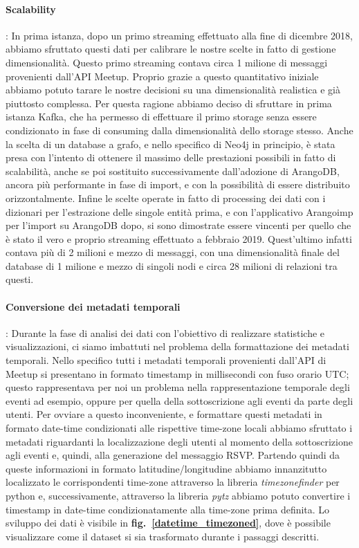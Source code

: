 \documentclass[fleqn,10pt]{SelfArx} %
\begin{document}
{{\paragraph{Scalability}: In prima istanza, dopo un primo streaming effettuato alla fine di dicembre 2018, abbiamo sfruttato questi dati per calibrare le nostre scelte in fatto di gestione dimensionalità. 
Questo primo streaming contava circa 1 milione di messaggi provenienti dall'API Meetup. 
Proprio grazie a questo quantitativo iniziale abbiamo potuto tarare le nostre decisioni su una dimensionalità realistica e già piuttosto complessa. 
Per questa ragione abbiamo deciso di sfruttare in prima istanza Kafka, che ha permesso di effettuare il primo storage senza essere condizionato in fase di consuming dalla dimensionalità dello storage stesso. 
Anche la scelta di un database a grafo, e nello specifico di Neo4j in principio, è stata presa con l'intento di ottenere il massimo delle prestazioni possibili in fatto di scalabilità, anche se poi sostituito successivamente dall'adozione di ArangoDB, ancora più performante in fase di import, e con la possibilità di essere distribuito orizzontalmente. 
Infine le scelte operate in fatto di processing dei dati con i dizionari per l'estrazione delle singole entità prima, e con l'applicativo Arangoimp per l'import su ArangoDB dopo, si sono dimostrate essere vincenti per quello che è stato il vero e proprio streaming effettuato a febbraio 2019.
Quest'ultimo infatti contava più di 2 milioni e mezzo di messaggi, con una dimensionalità finale del database di 1 milione e mezzo di singoli nodi e circa 28 milioni di relazioni tra questi.
\paragraph{Conversione dei metadati temporali}: Durante la fase di analisi dei dati con l'obiettivo di realizzare statistiche e visualizzazioni, ci siamo imbattuti nel problema della formattazione dei metadati temporali. Nello specifico tutti i metadati temporali provenienti dall'API di Meetup si presentano in formato timestamp in millisecondi con fuso orario UTC; questo rappresentava per noi un problema nella rappresentazione temporale degli eventi ad esempio, oppure per quella della sottoscrizione agli eventi da parte degli utenti. Per ovviare a questo inconveniente, e formattare questi metadati in formato date-time condizionati alle rispettive time-zone locali abbiamo sfruttato i metadati riguardanti la localizzazione degli utenti al momento della sottoscrizione agli eventi e, quindi, alla generazione del messaggio RSVP. Partendo quindi da queste informazioni in formato latitudine/longitudine abbiamo innanzitutto localizzato le corrispondenti time-zone attraverso la libreria \textit{timezonefinder} per python e, successivamente, attraverso la libreria \textit{pytz} abbiamo potuto convertire i timestamp in date-time condizionatamente alla time-zone prima definita. Lo sviluppo dei dati è visibile in \textbf{fig.~\ref{datetime_timezoned}}, dove è possibile visualizzare come il dataset si sia trasformato durante i passaggi descritti.
}}
\end{document}
